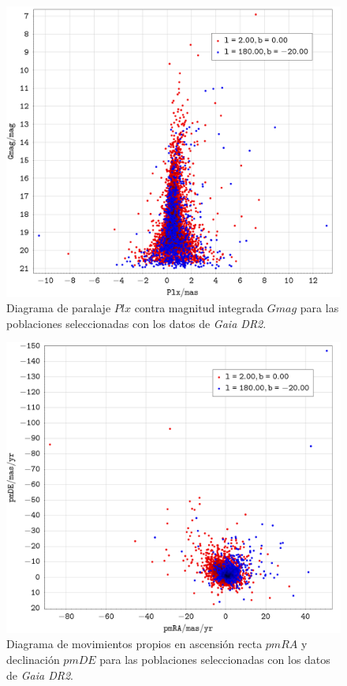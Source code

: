\documentclass[a4paper,fleqn,usenatbib]{mnras}
\begin{document}
\begin{figure}
  \includegraphics[width=\linewidth]{img/ejercicio1_plx_gmag}
  \caption{Diagrama de paralaje $Plx$ contra magnitud integrada $Gmag$ para las poblaciones seleccionadas con los datos de \emph{Gaia DR2}.}
  \label{fig:e1_plx}
\end{figure}

\begin{figure}
  \includegraphics[width=\linewidth]{img/ejercicio1_pmra_pmde}
  \caption{Diagrama de movimientos propios en ascensión recta $pmRA$ y declinación $pmDE$ para las poblaciones seleccionadas con los datos de \emph{Gaia DR2}.}
  \label{fig:e1_pmrapmde}
\end{figure}
\end{document}
